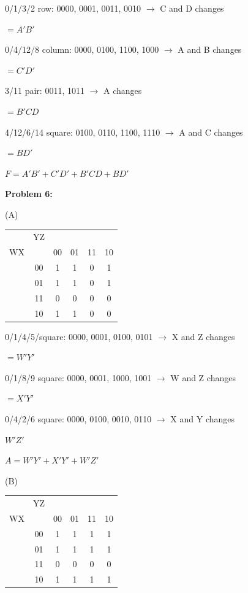 \documentclass{article}
\begin{document}
    0/1/3/2 row: 0000, 0001, 0011, 0010 $\rightarrow$ C and D changes

    \quad $=A'B'$

    0/4/12/8 column: 0000, 0100, 1100, 1000 $\rightarrow$ A and B changes

    \quad $=C'D'$

    3/11 pair: 0011, 1011 $\rightarrow$ A changes

    \quad $=B'CD$

    4/12/6/14 square: 0100, 0110, 1100, 1110 $\rightarrow$ A and C changes

    \quad $=BD'$

    $\boxed{F=A'B'+C'D'+B'CD+BD'}$


    \textbf{Problem 6:}

    \quad (A)

    \begin{center}
        \begin{tabular} {cc|cccc}
            & YZ & &&& \\
            WX && 00 & 01 & 11 & 10 \\
            \hline
            & 00 & 1 & 1 & 0 & 1 \\
            & 01 & 1 & 1 & 0 & 1 \\
            & 11 & 0 & 0 & 0 & 0 \\
            & 10 & 1 & 1 & 0 & 0 \\
        \end{tabular}
    \end{center}

    0/1/4/5/square: 0000, 0001, 0100, 0101 $\rightarrow$ X and Z changes

    \quad $=W'Y'$

    0/1/8/9 square: 0000, 0001, 1000, 1001 $\rightarrow$ W and Z changes

    \quad $=X'Y'$

    0/4/2/6 square: 0000, 0100, 0010, 0110 $\rightarrow$ X and Y changes

    \quad $W'Z'$

    $\boxed{A=W'Y' + X'Y' + W'Z'}$

    \quad (B)

    \begin{center}
        \begin{tabular} {cc|cccc}
            & YZ & &&& \\
            WX && 00 & 01 & 11 & 10 \\
            \hline
            & 00 & 1 & 1 & 1 & 1 \\
            & 01 & 1 & 1 & 1 & 1 \\
            & 11 & 0 & 0 & 0 & 0 \\
            & 10 & 1 & 1 & 1 & 1 \\
        \end{tabular}
    \end{center}
\end{document}
